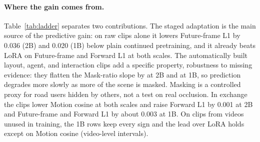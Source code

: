 \paragraph{Where the gain comes from.} Table~\ref{tab:ladder} separates two contributions. The staged adaptation is the main source of the predictive gain: on raw clips alone it lowers Future-frame L1 by 0.036 (2B) and 0.020 (1B) below plain continued pretraining, and it already beats LoRA on Future-frame and Forward L1 at both scales. The automatically built layout, agent, and interaction clips add a specific property, robustness to missing evidence: they flatten the Mask-ratio slope by \nLadderMaskTwoB{} at 2B and \nLadderMaskOneB{} at 1B, so prediction degrades more slowly as more of the scene is masked. Masking is a controlled proxy for road users hidden by others, not a test on real occlusion. In exchange the clips lower Motion cosine at both scales and raise Forward L1 by 0.001 at 2B and Future-frame and Forward L1 by about 0.003 at 1B. On \nHeldoutClips{} clips from \nHeldoutVideos{} videos unused in training, the 1B rows keep every sign and the lead over LoRA holds except on Motion cosine (video-level intervals).
